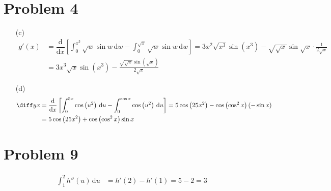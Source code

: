 \documentclass[preview, margin=0.6in]{standalone}
\newcommand*{\problem}[1]{\section*{Problem #1}}
\newcommand*{\deriv}[1][x]{\ensuremath{\dfrac{\mathrm{d}}{\mathrm{d}#1}}}
\begin{document}
\problem{4}
\begin{itemize}
	\item[(c)]
		\begin{align*}
		    g'(x)
			&=\deriv[x]\left[\int_{0}^{x^3}\sqrt{w}\sin w\,\mathrm{d}w-\int_{0}^{\sqrt{x}}\sqrt{w}\sin w\,\mathrm{d}w\right]
			=3x^2 \sqrt{x^3}\sin\left(x^3\right)-\sqrt{\sqrt{x}}\sin \sqrt{x}\cdot \frac{1}{2 \sqrt{x}} \\
			&=3x^3 \sqrt{x}\sin\left(x^3\right)-\frac{\sqrt{\sqrt{x}}\sin\left(\sqrt{x}\right)}{2 \sqrt{x}}
		\end{align*}
	\item[(d)]
		\begin{align*}
		    \diff yx
			&=\deriv[x]\left[\int_{0}^{5x}\cos\left(u^2\right)\,\mathrm{d}u-\int_{0}^{\cos x}\cos\left(u^2\right)\,\mathrm{d}u\right]
			=5 \cos\left(25x^2\right)-\cos\left(\cos^2x\right)(-\sin x) \\ 
			&=5 \cos\left(25x^2\right)+\cos\left(\cos^2x\right)\sin x
		\end{align*}
\end{itemize}

\problem{9}
\begin{align*}
	\int_{1}^{2}h''(u)\,\mathrm{d}u&=h'(2)-h'(1)=5-2=3
\end{align*}
\end{document}
